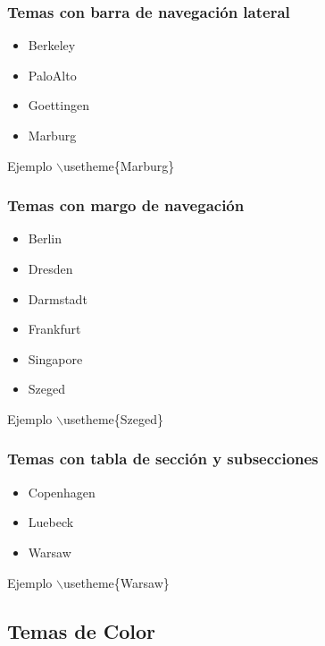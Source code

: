\documentclass[aspectratio=1610]{beamer}%
\begin{document}
\begin{frame}[fragile]
\frametitle{\textbf{Temas con barra de navegación lateral}}
\justifying
 \begin{itemize}\justifying
  \item Berkeley
  \item PaloAlto
  \item Goettingen
  \item Marburg
\end{itemize}
\begin{block}{Ejemplo}
$\backslash$usetheme\{Marburg\}
\end{block}
\end{frame}

\begin{frame}[fragile]
\frametitle{\textbf{Temas con margo de navegación}}
\justifying
 \begin{itemize}\justifying
  \item Berlin
  \item Dresden
  \item Darmstadt
  \item  Frankfurt
  \item Singapore
  \item Szeged
\end{itemize}
\begin{block}{Ejemplo}
$\backslash$usetheme\{Szeged\}
\end{block}
\end{frame}

\begin{frame}[fragile]
\frametitle{\textbf{Temas con tabla de sección y subsecciones}}
\justifying
 \begin{itemize}\justifying
  \item Copenhagen
  \item Luebeck
  \item Warsaw
\end{itemize}

\begin{block}{Ejemplo}
$\backslash$usetheme\{Warsaw\}
\end{block}


\end{frame}

\subsection{Temas de Color}
\end{document}
